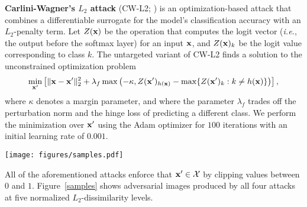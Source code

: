 \textbf{Carlini-Wagner's $L_2$ attack} (CW-L2; \cite{carlini2017towards}) is an optimization-based attack that
combines a differentiable surrogate for the model's classification accuracy with an $L_2$-penalty
term. Let $Z(\mathbf{x})$ be the operation that computes the logit vector (\emph{i.e.}, the output before the softmax layer)
for an input $\mathbf{x}$, and $Z(\mathbf{x})_k$ be the logit value corresponding to class $k$. The untargeted variant of CW-L2 finds a solution to the unconstrained
optimization problem
\begin{equation}
\label{cwl2}
\min_{\mathbf{x}'} \left[ \| \mathbf{x} - \mathbf{x}' \|_2^2 + \lambda_f \max\left(-\kappa, Z(\mathbf{x}')_{h(\mathbf{x})} - \max \{Z(\mathbf{x}')_k : k \neq h(\mathbf{x})\}\right) \right],
\end{equation}
where $\kappa$ denotes a margin parameter, and where the parameter $\lambda_f$ trades off the perturbation norm and the hinge loss of predicting a different class. We perform the minimization over $\mathbf{x}'$ using the Adam optimizer \citep{kingma2014adam} for $100$ iterations with an initial learning rate of $0.001$. 

\begin{figure*}[t!]
    \centering
    \texttt{[image: figures/samples.pdf]}
    \caption{Adversarial images and corresponding perturbations at five levels of normalized $L_2$-dissimilarity for all four attacks.}\label{samples}
\end{figure*}

All of the aforementioned attacks enforce that $\mathbf{x}' \in \mathcal{X}$ by clipping values between $0$ and $1$. Figure~\ref{samples} shows adversarial images produced by all four attacks at five normalized $L_2$-dissimilarity levels.
